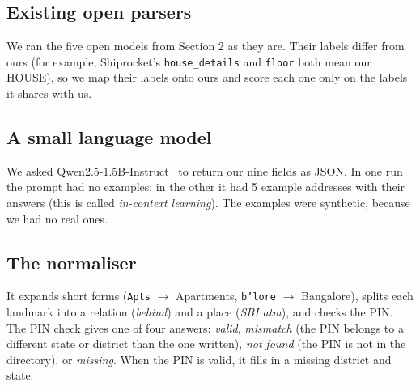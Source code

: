 \documentclass[11pt,a4paper]{article}
\newcommand{\code}[1]{\texttt{#1}}
\begin{document}
\subsection{Existing open parsers}
We ran the five open models from Section 2 as they are. Their labels differ from ours (for example, Shiprocket's
\code{house\_details} and \code{floor} both mean our HOUSE), so we map their labels onto ours and score each one only
on the labels it shares with us.

\subsection{A small language model}
We asked Qwen2.5-1.5B-Instruct~\cite{qwen} to return our nine fields as JSON. In one run the prompt had no examples;
in the other it had 5 example addresses with their answers (this is called \emph{in-context learning}). The examples
were synthetic, because we had no real ones.

\subsection{The normaliser}
It expands short forms (\code{Apts} $\rightarrow$ Apartments, \code{b'lore} $\rightarrow$ Bangalore), splits each
landmark into a relation (\emph{behind}) and a place (\emph{SBI atm}), and checks the PIN. The PIN check gives one of
four answers: \emph{valid}, \emph{mismatch} (the PIN belongs to a different state or district than the one written),
\emph{not found} (the PIN is not in the directory), or \emph{missing}. When the PIN is valid, it fills in a missing
district and state.
\end{document}
